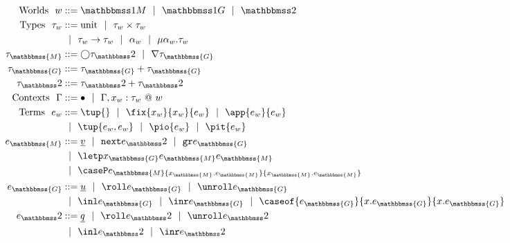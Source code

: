 
\newcommand{\exprM}{e_\mathbbmss{M}}
\newcommand{\exprG}{e_\mathbbmss{G}}
\newcommand{\exprT}{e_\bbtwo}
\newcommand{\varM}{x_\mathbbmss{M}}
\newcommand{\varG}{x_\mathbbmss{G}}
\newcommand{\varT}{x_\bbtwo}
\newcommand{\typeM}{\tau_\mathbbmss{M}}
\newcommand{\typeG}{\tau_\mathbbmss{G}}
\newcommand{\typeT}{\tau_\bbtwo}

\begin{figure}
\begin{abstrsyn}
\[\begin{aligned}
\text{Worlds}\ \ 
\world &::= \bbonem \gbar \bbonep \gbar \bbtwo  \\
%
\text{Types}\ \ 
\type_w &::= \text{unit}
 \gbar \type_w \times \type_w \\
&\gbar \type_w \to \type_w
 \gbar \alpha_w \gbar \mu \alpha_w.\tau_w \\
\typeM &::= \fut \typeT \gbar \curr \typeG \\
%
\typeG &::= \typeG + \typeG \\
%
\typeT &::= \typeT + \typeT \\
%
%
\text{Contexts}\ \ 
\context &::=\emptyC
 \gbar \context, x_w:\tau_w~@~w \\
%
\text{Terms}\ \ 
e_w &::= \tup{}
 \gbar \fix {x_w} {x_w} {e_w}
 \gbar \app {e_w} {e_w} \\
&\gbar \tup{e_w, e_w} 
 \gbar \pio {e_w} 
 \gbar \pit {e_w} \\
\exprM &::= \exv v
 \gbar \next \exprT 
 \gbar \pure \exprG \\
&\gbar \letp \varG \exprM \exprM \\
&\gbar \caseP \exprM {\varM.\exprM} {\varM.\exprM} \\
\exprG &::= \exv u
 \gbar \roll \exprG \gbar \unroll \exprG \\
&\gbar \inl \exprG \gbar \inr \exprG
 \gbar \caseof {\exprG}{\var.\exprG}{\var.\exprG} \\ 
\exprT &::= \exv q
 \gbar \roll \exprT \gbar \unroll \exprT \\
&\gbar \inl \exprT \gbar \inr \exprT

\end{aligned}\]
\end{abstrsyn}
\end{figure}
